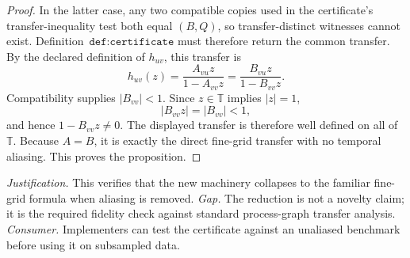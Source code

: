 \documentclass{article}
\begin{document}
\begin{proof}
In the latter case, any two compatible copies used in the certificate's transfer-inequality test both equal \((B,Q)\), so transfer-distinct witnesses cannot exist. Definition~\(\texttt{def:certificate}\) must therefore return the common transfer. By the declared definition of \(h_{uv}\), this transfer is
\[
h_{uv}(z)=\frac{A_{vu}z}{1-A_{vv}z}
          =\frac{B_{vu}z}{1-B_{vv}z}.
\]
Compatibility supplies \(|B_{vv}|<1\). Since \(z\in\mathbb T\) implies \(|z|=1\),
\[
|B_{vv}z|=|B_{vv}|<1,
\]
and hence \(1-B_{vv}z\ne0\). The displayed transfer is therefore well defined on all of \(\mathbb T\). Because \(A=B\), it is exactly the direct fine-grid transfer with no temporal aliasing. This proves the proposition.
\end{proof}
\par\smallskip\noindent \textit{Justification.} This verifies that the new machinery collapses to the familiar fine-grid formula when aliasing is removed. \textit{Gap.} The reduction is not a novelty claim; it is the required fidelity check against standard process-graph transfer analysis. \textit{Consumer.} Implementers can test the certificate against an unaliased benchmark before using it on subsampled data.
\end{document}
